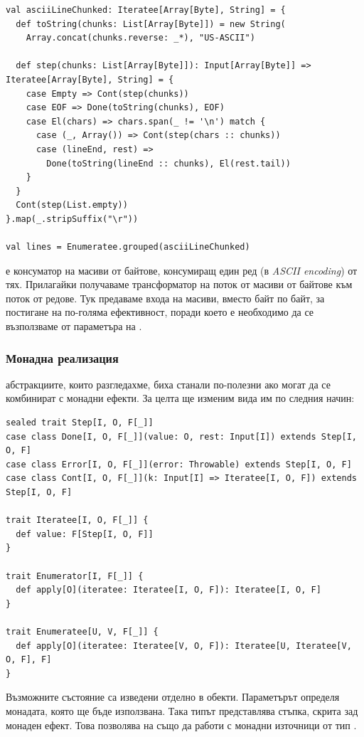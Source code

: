 \begin{lstlisting}
val asciiLineChunked: Iteratee[Array[Byte], String] = {
  def toString(chunks: List[Array[Byte]]) = new String(
    Array.concat(chunks.reverse: _*), "US-ASCII")
  
  def step(chunks: List[Array[Byte]]): Input[Array[Byte]] => Iteratee[Array[Byte], String] = {
    case Empty => Cont(step(chunks))
    case EOF => Done(toString(chunks), EOF)
    case El(chars) => chars.span(_ != '\n') match {
      case (_, Array()) => Cont(step(chars :: chunks))
      case (lineEnd, rest) =>
        Done(toString(lineEnd :: chunks), El(rest.tail))
    }
  }
  Cont(step(List.empty))
}.map(_.stripSuffix("\r"))

val lines = Enumeratee.grouped(asciiLineChunked)
\end{lstlisting}

 е консуматор на масиви от байтове, консумиращ един ред (в \emph{ASCII encoding}) от тях. Прилагайки  получаваме  трансформатор на поток от масиви от байтове към поток от редове. Тук предаваме входа на масиви, вместо байт по байт, за постигане на по-голяма ефективност, поради което е необходимо да се възползваме от  параметъра на .

\subsubsection{Монадна реализация}

 абстракциите, които разгледахме, биха станали по-полезни ако могат да се комбинират с монадни ефекти. За целта ще изменим вида им по следния начин:

\begin{lstlisting}
sealed trait Step[I, O, F[_]]
case class Done[I, O, F[_]](value: O, rest: Input[I]) extends Step[I, O, F]
case class Error[I, O, F[_]](error: Throwable) extends Step[I, O, F]
case class Cont[I, O, F[_]](k: Input[I] => Iteratee[I, O, F]) extends Step[I, O, F]

trait Iteratee[I, O, F[_]] {
  def value: F[Step[I, O, F]]
}

trait Enumerator[I, F[_]] {
  def apply[O](iteratee: Iteratee[I, O, F]): Iteratee[I, O, F]
}

trait Enumeratee[U, V, F[_]] {
  def apply[O](iteratee: Iteratee[V, O, F]): Iteratee[U, Iteratee[V, O, F], F]
}
\end{lstlisting}

Възможните състояние са изведени отделно в  обекти. Параметърът  определя монадата, която ще бъде използвана. Така типът  представлява стъпка, скрита зад монаден ефект. Това позволява на  също да работи с монадни източници от тип .

